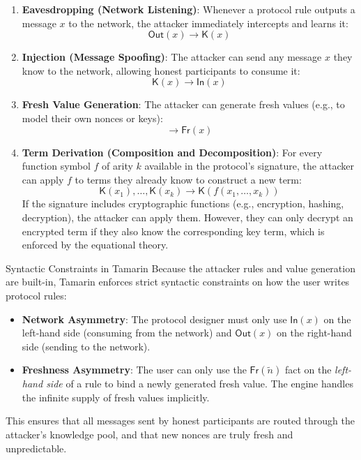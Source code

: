\begin{enumerate}
  \item \textbf{Eavesdropping (Network Listening)}: Whenever a protocol rule outputs a message $x$ to the network, the attacker immediately intercepts and learns it:
  \[
    \mathsf{Out}(x) \longrightarrow \mathsf{K}(x)
  \]
  \item \textbf{Injection (Message Spoofing)}: The attacker can send any message $x$ they know to the network, allowing honest participants to consume it:
  \[
    \mathsf{K}(x) \longrightarrow \mathsf{In}(x)
  \]
  \item \textbf{Fresh Value Generation}: The attacker can generate fresh values (e.g., to model their own nonces or keys):
  \[
    \longrightarrow \mathsf{Fr}(x)
  \]
  \item \textbf{Term Derivation (Composition and Decomposition)}: For every function symbol $f$ of arity $k$ available in the protocol's signature, the attacker can apply $f$ to terms they already know to construct a new term:
  \[
    \mathsf{K}(x_1), \dots, \mathsf{K}(x_k) \longrightarrow \mathsf{K}(f(x_1, \dots, x_k))
  \]
  If the signature includes cryptographic functions (e.g., encryption, hashing, decryption), the attacker can apply them. However, they can only decrypt an encrypted term if they also know the corresponding key term, which is enforced by the equational theory.
\end{enumerate}

\begin{intermezzo}{Syntactic Constraints in Tamarin}
Because the attacker rules and value generation are built-in, Tamarin enforces strict syntactic constraints on how the user writes protocol rules:
\begin{itemize}
  \item \textbf{Network Asymmetry}: The protocol designer must only use $\mathsf{In}(x)$ on the left-hand side (consuming from the network) and $\mathsf{Out}(x)$ on the right-hand side (sending to the network).
  \item \textbf{Freshness Asymmetry}: The user can only use the $\mathsf{Fr}(\tilde n)$ fact on the \emph{left-hand side} of a rule to bind a newly generated fresh value. The engine handles the infinite supply of fresh values implicitly.
\end{itemize}
This ensures that all messages sent by honest participants are routed through the attacker's knowledge pool, and that new nonces are truly fresh and unpredictable.
\end{intermezzo}

